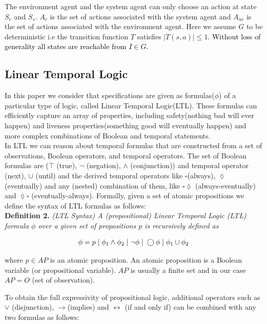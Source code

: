 \documentclass[letterpaper, 10 pt, conference]{ieeeconf}  %
\begin{document}
The environment agent and the system agent can only choose an action at state $S_e$ and $S_s$. $A_c$ is the set of actions associated with the system agent and $A_{uc}$ is the set of actions associated with the environment agent. Here we assume $G$ to be deterministic i.e the transition function $T$ satisfies $|T(s, a)| \leq 1$.\textcolor{black}{ Without loss of generality all states are reachable from $I \in G$.}

\subsection{Linear Temporal Logic}

In this paper we consider that specifications are given as formulas($\phi$) of a particular type of logic, called Linear Temporal Logic(LTL). These formulas can efficiently capture an array of properties, including safety(nothing bad will ever happen) and liveness properties(something good will eventually happen) and more complex combinations of Boolean and temporal statements. \\

In LTL we can reason about temporal formulas that are constructed from a set of observations, Boolean operators, and temporal operators. The set of Boolean formulas are ($\top$ (true), $\neg$ (negation), $\wedge$ (conjunction)) and temporal operator \bigcirc(next), $\cup$ (until) and the derived temporal operators like $\square$(always), $\lozenge$(eventually) and any (nested) combination of them, like $\square \lozenge$ (always-eventually) and $\lozenge \square$ (eventually-always). Formally, given a set of atomic propositions we define the syntax of LTL formulas as follows:\\

\textbf{Definition 2.} \textit{(LTL Syntax) A (propositional) Linear Temporal Logic (LTL) formula $\phi$ over a given set of propositions $p$ is recursively defined as}

\begin{equation}
\phi = p \; \arrowvert\;  \phi_1 \wedge \phi_2\;  \arrowvert\; \neg \phi\; \arrowvert\; \bigcirc \phi\; \arrowvert\; \phi_1 \cup \phi_2
\end{equation}

where $p \in AP$ is an atomic proposition. An atomic proposition is a Boolean variable (or propositional variable). $AP$ is usually a finite set and in our case $AP = O$ (set of observation).

To obtain the full expressivity of propositional logic, additional operators such as $\vee$ (disjunction), $\rightarrow$(implies) and $\leftrightarrow$ (if and only if) can be combined with any two formulas as follows: 
\end{document}
